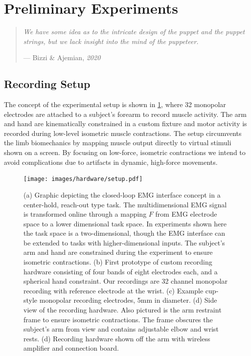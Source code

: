 \documentclass[
  a4paper,
]{article}
\begin{document}
\clearpage

\hypertarget{sec:experiment}{%
\section{Preliminary Experiments}\label{sec:experiment}}

\begin{quote}
\emph{We have some idea as to the intricate design of the puppet and the
puppet strings, but we lack insight into the mind of the puppeteer.}

--- Bizzi \& Ajemian, \emph{2020}
\end{quote}

\hypertarget{recording-setup}{%
\subsection{Recording Setup}\label{recording-setup}}

The concept of the experimental setup is shown in \cref{fig:setup},
where 32 monopolar electrodes are attached to a subject's forearm to
record muscle activity. The arm and hand are kinematically constrained
in a custom fixture and motor activity is recorded during low-level
isometric muscle contractions. The setup circumvents the limb
biomechanics by mapping muscle output directly to virtual stimuli shown
on a screen. By focusing on low-force, isometric contractions we intend
to avoid complications due to artifacts in dynamic, high-force
movements.

\begin{figure}
\hypertarget{fig:setup}{%
\centering
\texttt{[image: images/hardware/setup.pdf]}
\caption{(a) Graphic depicting the closed-loop EMG interface concept in
a center-hold, reach-out type task. The multidimensional EMG signal is
transformed online through a mapping \(F\) from EMG electrode space to a
lower dimensional task space. In experiments shown here the task space
is a two-dimensional, though the EMG interface can be extended to tasks
with higher-dimensional inputs. The subject's arm and hand are
constrained during the experiment to ensure isometric contractions. (b)
First prototype of custom recording hardware consisting of four bands of
eight electrodes each, and a spherical hand constraint. Our recordings
are 32 channel monopolar recording with reference electrode at the
wrist. (c) Example cup-style monopolar recording electrodes, 5mm in
diameter. (d) Side view of the recording hardware. Also pictured is the
arm restraint frame to ensure isometric contractions. The frame obscures
the subject's arm from view and contains adjustable elbow and wrist
rests. (d) Recording hardware shown off the arm with wireless amplifier
and connection board.}\label{fig:setup}
}
\end{figure}
\end{document}
